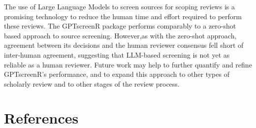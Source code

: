 \documentclass[10pt,a4paper,twocolumn]{article}
\begin{document}
The use of Large Language Models to screen sources for scoping reviews is a promising technology to reduce the human time and effort required to perform these reviews. The GPTscreenR package performs comparably to a zero-shot based approach to source screening. However,as with the zero-shot approach, agreement between its decisions and the human reviewer consensus fell short of inter-human agreement, suggesting that LLM-based screening is not yet as reliable as a human reviewer. Future work may help to further quantify and refine GPTscreenR's performance, and to expand this approach to other types of scholarly review and to other stages of the review process.

\section{References}


 
\end{document}
